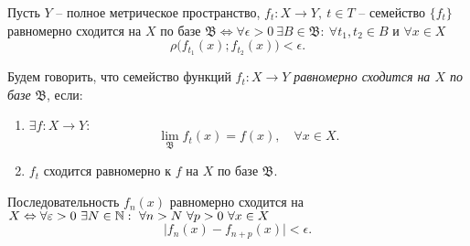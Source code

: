 \begin{theorem}
    Пусть $Y$ -- полное метрическое пространство, $f_t:X \rightarrow Y, \ t \in T$ -- семейство $\{f_t\}$ равномерно сходится на $X$ по базе $\mathfrak{B} \iff \forall \epsilon > 0 \ \exists B \in \mathfrak{B}: \ \forall t_1,t_2 \in B$ и $\forall x \in X$
    \[
        \rho\big(f_{t_1}(x);f_{t_2}(x)\big) < \epsilon.
    \]
\end{theorem}

\begin{definition}
    Будем говорить, что семейство функций $f_t: X \rightarrow Y$ \emph{равномерно сходится на $X$ по базе} $\mathfrak{B}$, если:
    \begin{enumerate}
        \item $\exists f: X \rightarrow Y:$
              \[
                  \underset{\mathfrak{B}}{\lim}f_t(x) = f(x), \quad \forall x \in X.
              \]
        \item $f_t$ сходится равномерно к $f$ на $X$ по базе $\mathfrak{B}$.
    \end{enumerate}
\end{definition}

\begin{theorem}
    Последовательность $f_n(x)$ равномерно сходится на $X \Leftrightarrow \forall \varepsilon > 0 \ \exists N \in \mathbb{N}: \ \forall n > N \ \forall p > 0 \ \forall x \in X$
    \[
        \big|f_n(x) - f_{n+p}(x)\big| < \epsilon.
    \]
\end{theorem}

